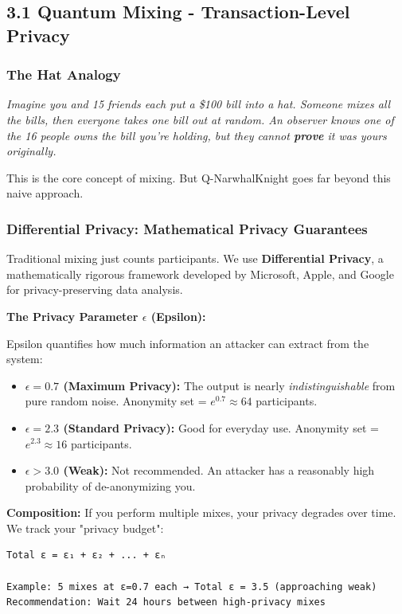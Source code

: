 \documentclass[11pt,a4paper]{article}
\begin{document}
\subsection{3.1 Quantum Mixing - Transaction-Level Privacy}

\subsubsection{The Hat Analogy}

\textit{Imagine you and 15 friends each put a \$100 bill into a hat. Someone mixes all the bills, then everyone takes one bill out at random. An observer knows one of the 16 people owns the bill you're holding, but they cannot \textbf{prove} it was yours originally.}

This is the core concept of mixing. But Q-NarwhalKnight goes far beyond this naive approach.

\subsubsection{Differential Privacy: Mathematical Privacy Guarantees}

Traditional mixing just counts participants. We use \textbf{Differential Privacy}, a mathematically rigorous framework developed by Microsoft, Apple, and Google for privacy-preserving data analysis.

\textbf{The Privacy Parameter $\epsilon$ (Epsilon):}

Epsilon quantifies how much information an attacker can extract from the system:
\begin{itemize}
    \item \textbf{$\epsilon = 0.7$ (Maximum Privacy):} The output is nearly \textit{indistinguishable} from pure random noise. Anonymity set = $e^{0.7} \approx 64$ participants.

    \item \textbf{$\epsilon = 2.3$ (Standard Privacy):} Good for everyday use. Anonymity set = $e^{2.3} \approx 16$ participants.

    \item \textbf{$\epsilon > 3.0$ (Weak):} Not recommended. An attacker has a reasonably high probability of de-anonymizing you.
\end{itemize}

\textbf{Composition:} If you perform multiple mixes, your privacy degrades over time. We track your "privacy budget":
\begin{verbatim}
Total ε = ε₁ + ε₂ + ... + εₙ

Example: 5 mixes at ε=0.7 each → Total ε = 3.5 (approaching weak)
Recommendation: Wait 24 hours between high-privacy mixes
\end{verbatim}
\end{document}
